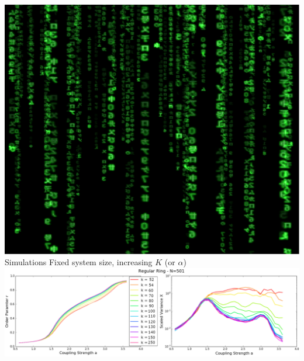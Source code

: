 \documentclass[serif,mathserif]{beamer}
\begin{document}
\begin{frame}{\includegraphics[height=0.06\textheight]{matrix.eps}\hspace{0.25cm} Simulations}
    \centering
    Fixed system size, increasing $K$ (or $\alpha$)\\
    \vspace{0.25cm}
    \includegraphics[width=\textwidth]{ringOP.eps}
\end{frame}
\end{document}
